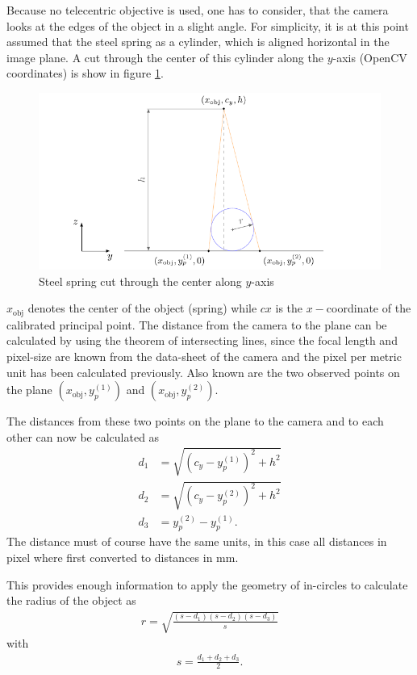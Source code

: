 Because no telecentric objective is used, one has to consider, that the camera looks at the edges of the object in a slight angle.
For simplicity, it is at this point assumed that the steel spring as a cylinder, which is aligned horizontal in the image plane.
A cut through the center of this cylinder along the $y$-axis (OpenCV coordinates) is show in figure \ref{development:diameter}.
\begin{figure}[ht]
	\centering
	\includegraphics[width=0.9\linewidth]{3-development/software/images/diameter_estimation.pdf}
	\caption{Steel spring cut through the center along $y$-axis\label{development:diameter}}
\end{figure}
$x_{\text{obj}}$ denotes the center of the object (spring) while $cx$ is the $x-$coordinate of the calibrated principal point.
The distance from the camera to the plane can be calculated by using the theorem of intersecting lines, since the focal length and pixel-size are known from the data-sheet of the camera and the pixel per metric unit has been calculated previously.
Also known are the two observed points on the plane $(x_{\text{obj}}, y_p^{(1)})$ and $(x_{\text{obj}}, y_p^{(2)})$.

The distances from these two points on the plane to the camera and to each other can now be calculated as
\begin{align*}
	d_{1}&=\sqrt{(c_y-y_p^{(1)})^2+h^2}\\
	d_{2}&=\sqrt{(c_y-y_p^{(2)})^2+h^2}\\
	d_{3}&=y_p^{(2)}-y_p^{(1)}.
\end{align*}
The distance must of course have the same units, in this case all distances in pixel where first converted to distances in mm.

This provides enough information to apply the geometry of in-circles \cite{incircles} to calculate the radius of the object as
\begin{align*}
	r=\sqrt{\frac{(s-d_1)(s-d_2)(s-d_3)}{s}}
\end{align*}
with
\begin{align*}
	s=\frac{d_1+d_2+d_3}{2}.
\end{align*}

